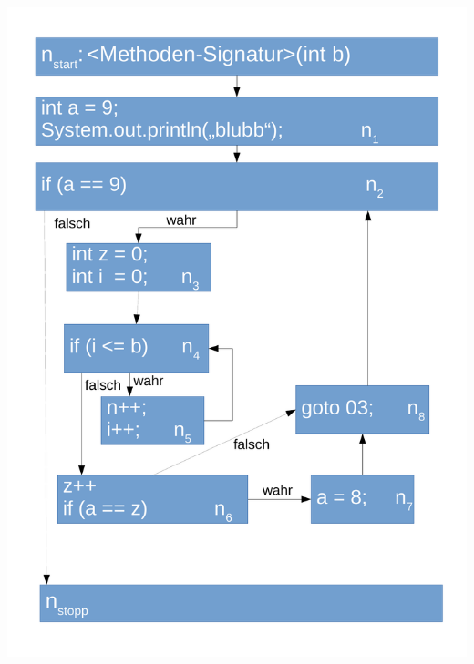 \documentclass[18pt]{beamer}
\begin{document}
	\begin{frame}
		\centering \includegraphics[scale=0.29]{./pics/tut5/kfo.pdf}
	\end{frame}
\end{document}
